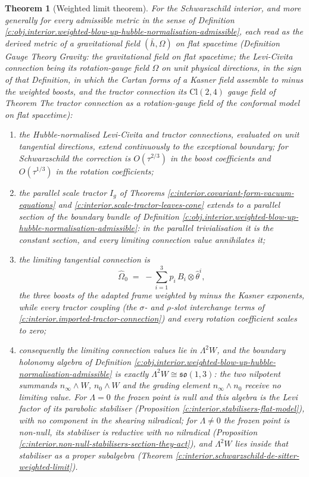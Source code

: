 \documentclass[11pt]{article}
\newtheorem{theorem}{Theorem}[section]
\theoremstyle{definition}
\theoremstyle{plain}
\newcommand{\changedmark}[2]{\marginpar{\raggedright\scriptsize\color{#1}#2}}
\providecommand{\Cl}{}\renewcommand{\Cl}{\mathrm{Cl}}
\providecommand{\hb}{}\renewcommand{\hb}{\bar{h}}
\providecommand{\nInf}{}\renewcommand{\nInf}{n_\infty}
\providecommand{\nO}{}\renewcommand{\nO}{n_0}
\begin{document}
\begin{theorem}[Weighted limit theorem]\label{c:interior.weighted-limit-theorem}
\changedmark{BurntOrange}{changed since the deposit}
For the Schwarzschild interior, and more generally for every admissible metric in the sense of Definition \ref{c:obj.interior.weighted-blow-up-hubble-normalisation-admissible}, each read as the derived metric of a gravitational field $(\hb, \Omega)$ on flat spacetime (Definition \emph{Gauge Theory Gravity: the gravitational field on flat spacetime}; the Levi-Civita connection being its rotation-gauge field $\Omega$ on unit physical directions, in the sign of that Definition, in which the Cartan forms of a Kasner field assemble to minus the weighted boosts, and the tractor connection its $\Cl(2,4)$ gauge field of Theorem \emph{The tractor connection as a rotation-gauge field of the conformal model on flat spacetime}):
\begin{enumerate}
\item the Hubble-normalised Levi-Civita and tractor connections, evaluated on unit tangential directions, extend continuously to the exceptional boundary; for Schwarzschild the correction is $O(\tau^{2/3})$ in the boost coefficients and $O(\tau^{1/3})$ in the rotation coefficients;
\item the parallel scale tractor $I_g$ of Theorems \ref{c:interior.covariant-form-vacuum-equations} and \ref{c:interior.scale-tractor-leaves-cone} extends to a parallel section of the boundary bundle of Definition \ref{c:obj.interior.weighted-blow-up-hubble-normalisation-admissible}: in the parallel trivialisation it is the constant section, and every limiting connection value annihilates it;
\item the limiting tangential connection is
\[
\widehat\Omega_0 \;=\; -\sum_{i=1}^3 p_i\, B_i \otimes \hat\theta^i ,
\]
the three boosts of the adapted frame weighted by minus the Kasner exponents, while every tractor coupling (the $\sigma$- and $\rho$-slot interchange terms of \ref{c:interior.imported-tractor-connection}) and every rotation coefficient scales to zero;
\item consequently the limiting connection values lie in $\Lambda^2 W$, and the boundary holonomy algebra of Definition \ref{c:obj.interior.weighted-blow-up-hubble-normalisation-admissible} is exactly $\Lambda^2 W \cong \mathfrak{so}(1,3)$: the two nilpotent summands $\nInf \wedge W$, $\nO \wedge W$ and the grading element $\nInf \wedge \nO$ receive no limiting value. For $\Lambda = 0$ the frozen point is null and this algebra is the Levi factor of its parabolic stabiliser (Proposition \ref{c:interior.stabilisers-flat-model}), with no component in the shearing nilradical; for $\Lambda \neq 0$ the frozen point is non-null, its stabiliser is reductive with no nilradical (Proposition \ref{c:interior.non-null-stabilisers-section-they-act}), and $\Lambda^2 W$ lies inside that stabiliser as a proper subalgebra (Theorem \ref{c:interior.schwarzschild-de-sitter-weighted-limit}).

\end{enumerate}
\end{theorem}
\end{document}
